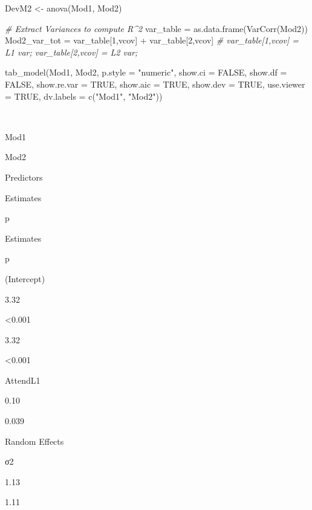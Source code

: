 \documentclass[
  english,
]{book}
\newenvironment{Shaded}{\begin{snugshade}}{\end{snugshade}}
\newcommand{\AttributeTok}[1]{\textcolor[rgb]{0.77,0.63,0.00}{#1}}
\newcommand{\CommentTok}[1]{\textcolor[rgb]{0.56,0.35,0.01}{\textit{#1}}}
\newcommand{\ConstantTok}[1]{\textcolor[rgb]{0.00,0.00,0.00}{#1}}
\newcommand{\DecValTok}[1]{\textcolor[rgb]{0.00,0.00,0.81}{#1}}
\newcommand{\FunctionTok}[1]{\textcolor[rgb]{0.00,0.00,0.00}{#1}}
\newcommand{\NormalTok}[1]{#1}
\newcommand{\OtherTok}[1]{\textcolor[rgb]{0.56,0.35,0.01}{#1}}
\newcommand{\SpecialCharTok}[1]{\textcolor[rgb]{0.00,0.00,0.00}{#1}}
\newcommand{\StringTok}[1]{\textcolor[rgb]{0.31,0.60,0.02}{#1}}
\begin{document}
\begin{Shaded}
\begin{Highlighting}[]
\NormalTok{DevM2 }\OtherTok{\textless{}{-}} \FunctionTok{anova}\NormalTok{(Mod1, Mod2) }

\CommentTok{\# Extract Variances to compute R\^{}2}
\NormalTok{  var\_table }\OtherTok{=} \FunctionTok{as.data.frame}\NormalTok{(}\FunctionTok{VarCorr}\NormalTok{(Mod2))}
\NormalTok{  Mod2\_var\_tot }\OtherTok{=}\NormalTok{ var\_table[}\DecValTok{1}\NormalTok{,}\StringTok{\textquotesingle{}vcov\textquotesingle{}}\NormalTok{] }\SpecialCharTok{+}\NormalTok{ var\_table[}\DecValTok{2}\NormalTok{,}\StringTok{\textquotesingle{}vcov\textquotesingle{}}\NormalTok{] }\CommentTok{\# var\_table[1,\textquotesingle{}vcov\textquotesingle{}] = L1 var; var\_table[2,\textquotesingle{}vcov\textquotesingle{}] = L2 var; }

\FunctionTok{tab\_model}\NormalTok{(Mod1, Mod2, }\AttributeTok{p.style =} \StringTok{"numeric"}\NormalTok{, }\AttributeTok{show.ci =} \ConstantTok{FALSE}\NormalTok{, }\AttributeTok{show.df =} \ConstantTok{FALSE}\NormalTok{, }\AttributeTok{show.re.var =} \ConstantTok{TRUE}\NormalTok{, }\AttributeTok{show.aic =} \ConstantTok{TRUE}\NormalTok{, }\AttributeTok{show.dev =} \ConstantTok{TRUE}\NormalTok{, }\AttributeTok{use.viewer =} \ConstantTok{TRUE}\NormalTok{, }\AttributeTok{dv.labels =} \FunctionTok{c}\NormalTok{(}\StringTok{"Mod1"}\NormalTok{, }\StringTok{"Mod2"}\NormalTok{))}
\end{Highlighting}
\end{Shaded}

~

Mod1

Mod2

Predictors

Estimates

p

Estimates

p

(Intercept)

3.32

\textless0.001

3.32

\textless0.001

AttendL1

0.10

0.039

Random Effects

σ2

1.13

1.11
\end{document}
